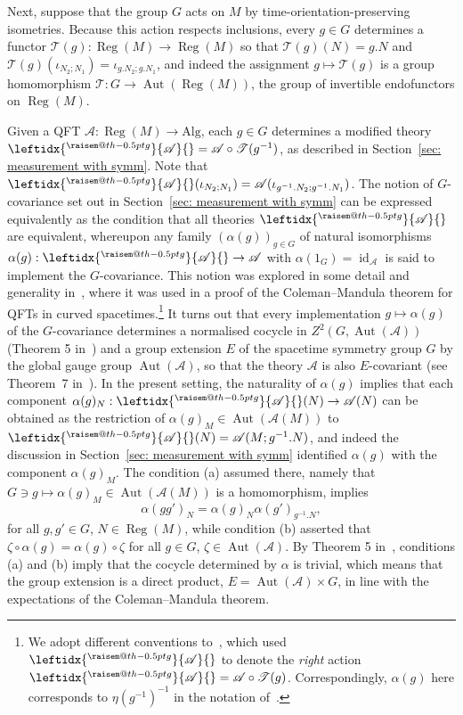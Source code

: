 \documentclass[sn-mathphys-num]{sn-jnl}%
\makeatletter
\newcommand{\raisemath}[1]{\mathpalette{\raisem@th{#1}}}
\newcommand{\raisem@th}[3]{\raisebox{#1}{$#2#3$}}
\newcommand{\act}[2]{\leftidx{^{\raisemath{-0.5pt}{#1}}}{#2}{}}
\newcommand{\Af}{\mathscr{A}}
\newcommand{\Tf}{\mathscr{T}}
\DeclareMathOperator{\id}{id}
\DeclareMathOperator{\Aut}{Aut}
\DeclareMathOperator{\Reg}{Reg}
\newcommand{\Alg}{\mathrm{Alg}}
\numberwithin{equation}{section}
\theoremstyle{thmstyleone}%
\theoremstyle{thmstyletwo}%
\theoremstyle{thmstylethree}%
\makeatother
\begin{document}
Next, suppose that the group $G$ acts on $M$ by time-orientation-preserving isometries. 
Because this action respects inclusions, every $g\in G$ determines a functor $\Tf(g):\Reg(M)\to\Reg(M)$ so that $\Tf(g)(N)=g.N$ and $\Tf(g)(\iota_{N_2;N_1})= \iota_{g.N_2;g.N_1}$, and indeed the assignment $g\mapsto \Tf(g)$ is a group homomorphism $\Tf:G\to\Aut(\Reg(M))$, the group of invertible endofunctors on $\Reg(M)$. 

 Given a QFT $\Af:\Reg(M)\to\Alg$, each $g\in G$ determines a modified theory $\act{g}{\Af}=\Af\circ \Tf(g^{-1})$, as described in Section~\ref{sec: measurement with symm}. Note that $\act{g}{\Af}(\iota_{N_2;N_1})= \Af(\iota_{g^{-1}.N_2;g^{-1}.N_1})$. 
 The notion of $G$-covariance set out in Section~\ref{sec: measurement with symm} can be expressed equivalently as the condition that all theories $\act{g}{\Af}$ are equivalent, whereupon any family $(\alpha(g))_{g\in G}$
 of natural isomorphisms $\alpha(g):\act{g}{\Af}\to\Af$ with $\alpha(1_G)=\id_{\Af}$ is said to implement the $G$-covariance. This notion was explored in some detail and generality in~\cite{Fewster:2018}, where it was used in a proof of the Coleman--Mandula theorem for QFTs in curved spacetimes.\footnote{We adopt different conventions to~\cite{Fewster:2018}, which used $\act{g}{\Af}$ to denote the 
 \emph{right} action $\act{g}{\Af}=\Af\circ\Tf(g)$. Correspondingly, $\alpha(g)$ here corresponds to
 $\eta(g^{-1})^{-1}$ in the notation of~\cite{Fewster:2018}.} It turns out that every implementation $g\mapsto\alpha(g)$ of the $G$-covariance determines a normalised cocycle in $Z^2(G,\Aut(\Af))$ (Theorem 5 in~\cite{Fewster:2018}) and a group extension $E$ of the spacetime symmetry group $G$ by the global gauge group $\Aut(\Af)$, so that the 
 theory $\Af$ is also $E$-covariant (see Theorem~7 in~\cite{Fewster:2018}). In the present setting, 
 the naturality of $\alpha(g)$ implies that each component $\alpha(g)_N:\act{g}{\Af}(N)\to \Af(N)$ can be obtained as the restriction of $\alpha(g)_M\in\Aut(\Af(M))$ to $\act{g}{\Af}(N)=\Af(M;g^{-1}.N)$, and indeed the discussion in Section~\ref{sec: measurement with symm} 
 identified $\alpha(g)$ with the component $\alpha(g)_M$. The condition (a) assumed there, namely that $G\owns g\mapsto\alpha(g)_M\in\Aut(\Af(M))$ is a homomorphism, implies
 \begin{equation}
     \alpha(gg')_N=\alpha(g)_N \alpha(g')_{g^{-1}.N},
 \end{equation}
 for all $g,g'\in G$, $N\in\Reg(M)$,
 while condition (b) asserted that $\zeta\circ\alpha(g)=\alpha(g)\circ\zeta$ for all $g\in G$, $\zeta\in\Aut(\Af)$. By Theorem 5 in~\cite{Fewster:2018}, conditions (a) and (b) imply that the cocycle determined by $\alpha$ is trivial, which means that the group extension is a direct product, $E=\Aut(\Af)\times G$, in line with the expectations of the Coleman--Mandula theorem. 
\end{document}
